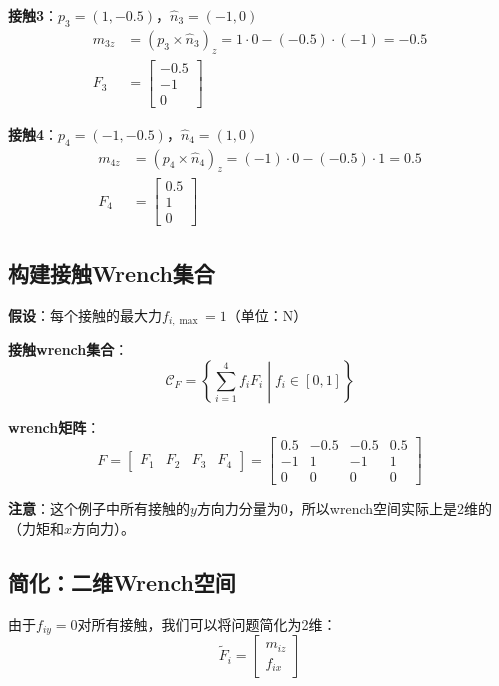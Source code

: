 \documentclass[12pt,a4paper]{article}
\begin{document}
\textbf{接触3}：$p_3 = (1, -0.5)$，$\hat{n}_3 = (-1, 0)$
\begin{align}
m_{3z} &= (p_3 \times \hat{n}_3)_z = 1 \cdot 0 - (-0.5) \cdot (-1) = -0.5 \\
F_3 &= \begin{bmatrix} -0.5 \\ -1 \\ 0 \end{bmatrix}
\end{align}

\textbf{接触4}：$p_4 = (-1, -0.5)$，$\hat{n}_4 = (1, 0)$
\begin{align}
m_{4z} &= (p_4 \times \hat{n}_4)_z = (-1) \cdot 0 - (-0.5) \cdot 1 = 0.5 \\
F_4 &= \begin{bmatrix} 0.5 \\ 1 \\ 0 \end{bmatrix}
\end{align}

\subsection{构建接触Wrench集合}

\textbf{假设}：每个接触的最大力$f_{i,\max} = 1$（单位：N）

\textbf{接触wrench集合}：
\begin{equation}
\mathcal{C}_F = \left\{\sum_{i=1}^4 f_i F_i \middle| f_i \in [0, 1] \right\}
\end{equation}

\textbf{wrench矩阵}：
\begin{equation}
F = \begin{bmatrix}
F_1 & F_2 & F_3 & F_4
\end{bmatrix} = \begin{bmatrix}
0.5 & -0.5 & -0.5 & 0.5 \\
-1 & 1 & -1 & 1 \\
0 & 0 & 0 & 0
\end{bmatrix}
\end{equation}

\textbf{注意}：这个例子中所有接触的$y$方向力分量为0，所以wrench空间实际上是2维的（力矩和$x$方向力）。

\subsection{简化：二维Wrench空间}

由于$f_{iy} = 0$对所有接触，我们可以将问题简化为2维：
\begin{equation}
\tilde{F}_i = \begin{bmatrix} m_{iz} \\ f_{ix} \end{bmatrix}
\end{equation}
\end{document}
